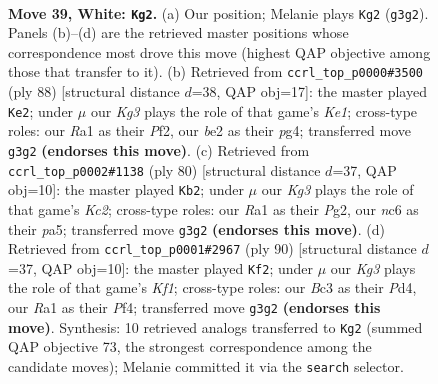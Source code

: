 \documentclass[11pt]{article}
\begin{document}
\clearpage

\begin{figure}[p]\centering
\begin{subfigure}{0.46\textwidth}\centering
\resizebox{\linewidth}{!}{%
\newchessgame
\chessboard[
  setfen={2r2k2/7r/p1nR4/8/1P3P2/2B3K1/P3b3/R7 w - - 11 39},
  showmover=false,
  pgfstyle=straightmove, color=movearrow, markmove={g3-g2}
]}
\caption{}
\end{subfigure}\hfill
\begin{subfigure}{0.46\textwidth}\centering
\resizebox{\linewidth}{!}{%
\newchessgame
\chessboard[
  setfen={8/8/2n2R2/2k1P3/r5p1/2B5/5P2/4K3 w - - 0 45},
  showmover=false,
  pgfstyle=straightmove, color=movearrow, markmove={e1-e2}
]}
\caption{}
\end{subfigure}
\\[4pt]
\begin{subfigure}{0.46\textwidth}\centering
\resizebox{\linewidth}{!}{%
\newchessgame
\chessboard[
  setfen={8/4k3/R7/p3rp2/2B5/7P/P1K2bP1/8 w - - 0 41},
  showmover=false,
  pgfstyle=straightmove, color=movearrow, markmove={c2-b2}
]}
\caption{}
\end{subfigure}\hfill
\begin{subfigure}{0.46\textwidth}\centering
\resizebox{\linewidth}{!}{%
\newchessgame
\chessboard[
  setfen={8/4r2k/3R4/1p1p1b2/3P1P2/6B1/6P1/5K2 w - - 0 46},
  showmover=false,
  pgfstyle=straightmove, color=movearrow, markmove={f1-f2}
]}
\caption{}
\end{subfigure}
\caption{\textbf{Move 39, White: \texttt{Kg2}.} (a) Our position; Melanie plays \texttt{Kg2} (\texttt{g3g2}). Panels (b)--(d) are the retrieved master positions whose correspondence most drove this move (highest QAP objective among those that transfer to it). (b) Retrieved from \texttt{ccrl\_top\_p0000\#3500} (ply 88) [structural distance $d$=38, QAP obj=17]: the master played \texttt{Ke2}; under $\mu$ our \emph{Kg3} plays the role of that game's \emph{Ke1}; cross-type roles: our \emph{R}a1 as their \emph{P}f2, our \emph{b}e2 as their \emph{p}g4; transferred move \texttt{g3g2} \textbf{(endorses this move)}. (c) Retrieved from \texttt{ccrl\_top\_p0002\#1138} (ply 80) [structural distance $d$=37, QAP obj=10]: the master played \texttt{Kb2}; under $\mu$ our \emph{Kg3} plays the role of that game's \emph{Kc2}; cross-type roles: our \emph{R}a1 as their \emph{P}g2, our \emph{n}c6 as their \emph{p}a5; transferred move \texttt{g3g2} \textbf{(endorses this move)}. (d) Retrieved from \texttt{ccrl\_top\_p0001\#2967} (ply 90) [structural distance $d$=37, QAP obj=10]: the master played \texttt{Kf2}; under $\mu$ our \emph{Kg3} plays the role of that game's \emph{Kf1}; cross-type roles: our \emph{B}c3 as their \emph{P}d4, our \emph{R}a1 as their \emph{P}f4; transferred move \texttt{g3g2} \textbf{(endorses this move)}. Synthesis: 10 retrieved analogs transferred to \texttt{Kg2} (summed QAP objective 73, the strongest correspondence among the candidate moves); Melanie committed it via the \texttt{search} selector.}
\label{fig:thought-m76}
\end{figure}
\end{document}
